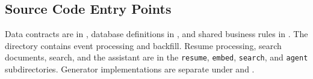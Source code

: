 \documentclass[11pt,a4paper]{article}
\newcommand{\code}[1]{\texttt{#1}}
\begin{document}
\subsection{Source Code Entry Points}

Data contracts are in , database definitions in , and shared business rules in . The  directory contains event processing and backfill. Resume processing, search documents, search, and the assistant are in the \code{resume}, \code{embed}, \code{search}, and \code{agent} subdirectories. Generator implementations are separate under  and .
\end{document}
